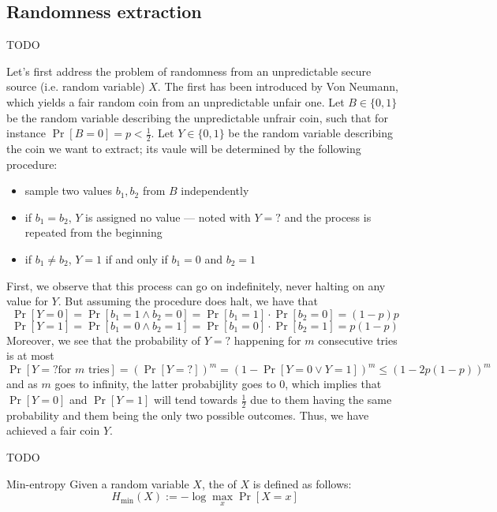 \documentclass[a4paper, 12pt]{report}
\begin{document}
\subsection{Randomness extraction}

TODO 

Let's first address the problem of  randomness from an unpredictable secure source (i.e. random variable) $X$. The first  has been introduced by Von Neumann, which yields a fair random coin from an unpredictable unfair one. Let $B \in \{0, 1\}$ be the random variable describing the unpredictable unfrair coin, such that for instance $\Pr[B = 0] = p < \tfrac{1}{2}$. Let $Y \in \{0, 1\}$ be the random variable describing the coin we want to extract; its vaule will be determined by the following procedure:

\begin{itemize}
	\item sample two values $b_1, b_2$ from $B$ independently
	\item if $b_1 = b_2$, $Y$ is assigned no value --- noted with $Y = ?$ and the process is repeated from the beginning
	\item if $b_1 \neq b_2$, $Y = 1$ if and only if $b_1 = 0$ and $b_2 = 1$
\end{itemize}

First, we observe that this process can go on indefinitely, never halting on any value for $Y$. But assuming the procedure does halt, we have that $$\Pr[Y = 0] = \Pr[b_1 = 1 \land b_2 = 0] = \Pr[b_1 = 1] \cdot \Pr[b_2 = 0] = (1 - p)p$$ $$\Pr[Y = 1] = \Pr[b_1 = 0 \land b_2 = 1] = \Pr[b_1 = 0] \cdot \Pr[b_2 = 1] = p(1 - p)$$ Moreover, we see that the probability of $Y = ?$ happening for $m$ consecutive tries is at most $$\Pr[Y = ? \mbox{for $m$ tries}] = (\Pr[Y = ?])^m = (1 - \Pr[Y = 0 \lor Y = 1])^m \le (1 - 2p(1 - p))^m$$ and as $m$ goes to infinity, the latter probabijlity goes to 0, which implies that $\Pr[Y = 0]$ and $\Pr[Y = 1]$ will tend towards $\tfrac{1}{2}$ due to them having the same probability and them being the only two possible outcomes. Thus, we have achieved a fair coin $Y$.

TODO 

\begin{frameddefn}{Min-entropy}
	Given a random variable $X$, the  of $X$ is defined as follows: $$H_{\mathrm{min}}(X) := - \log{\max_x{\Pr[X = x]}}$$
\end{frameddefn}
\end{document}

